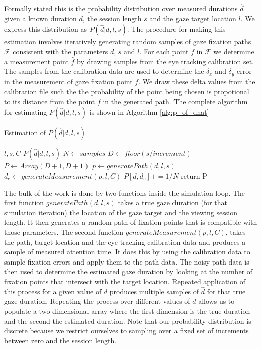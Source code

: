 \documentclass[12pt,a4paper]{article}
\numberwithin{equation}{section}
\begin{document}
Formally stated this is the probability distribution over measured durations $\hat{d}$ given a
known duration $d$, the session length $s$ and the gaze target location $l$. 
We express this distribution as $P(\hat{d}|d,l,s)$. The
procedure for making this estimation involves iteratively generating random samples
of gaze fixation paths $\mathcal{F}$ consistent with the parameters $d$, $s$ and $l$. 
For each point $f$ in $\mathcal{F}$ we determine a measurement point $\hat{f}$ 
by drawing samples from the eye tracking calibration set. 
The samples from the calibration data are used to determine the $\delta_x$ and $\delta_y$ 
error in the measurement of gaze fixation point $f$. 
We draw these delta values from the calibration file such the
the probability of the point being chosen is propotional to its distance from the point $f$
in the generated path. The complete algorithm
for estimating $P(\hat{d}|d,l,s)$ is shown in Algorithm \ref{alg:p_of_dhat}    

\begin{algorithm}
\caption{Estimation of $P(\hat{d}|d,l,s)$}\label{alg:p_of_dhat}
\begin{algorithmic}
  \Require $l,s,C$
  \Ensure $P(\hat{d}|d,l,s)$
  \State $N \gets samples$              
  \State $D \gets floor(s / increment)$ 
  \State $P \gets Array(D+1,D+1)$       
                    
                    
      \State $p \gets generatePath(d,l,s)$
      \State $d_e \gets generateMeasurement(p,l,C)$  
      \State $P[d,d_e] += 1/N$          
    \EndFor
  \EndFor
  \State return P
\end{algorithmic}
\end{algorithm}


The bulk of the work is done by two functions inside the simulation loop. The first function
$generatePath(d,l,s)$ takes a true gaze duration (for that simulation iteration) the location
of the gaze target and the viewing session length. It then
generates a random path of fixation points that is compatible with those parameters.
The second function 
$generateMeasurement(p,l,C)$, takes the path, target location and the eye tracking calibration 
data and produces a sample of measured attention time. It does this by using the calibration data to sample
fixation errors and apply them to the path data. The noisy path data is then used to determine
the estimated gaze duration by looking at the number of fixation points that intersect with the target
location.
Repeated application of this process for a given value of $d$ produces multiple samples of $\hat{d}$
for that true gaze duration. Repeating the process over different 
values of $d$ allows us to populate a two dimensional array where the first dimension is the
true duration and the second the estimated duration. Note that our probability distribution is discrete
because we restrict ourselves to sampling over a fixed set of increments 
between zero and the session length.
\end{document}
